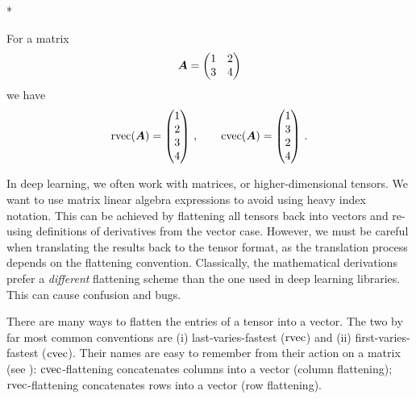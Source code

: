 \switchcolumn[1]*
\begin{example}\label{ex:flattening}
  For a matrix
  \begin{equation*}
    {\bm{A}} = \begin{pmatrix} 1 & 2 \\ 3 & 4 \end{pmatrix}
  \end{equation*}
  we have
  \begin{equation*}
    \operatorname{rvec}({\bm{A}})
    =
    \begin{pmatrix}
      1 \\ 2 \\ 3 \\ 4
    \end{pmatrix}\,,
    \qquad
    \operatorname{cvec}({\bm{A}})
    =
    \begin{pmatrix}
      1 \\ 3 \\ 2 \\ 4
    \end{pmatrix}\,.
  \end{equation*}
\end{example}
\switchcolumn[0]

\vspace{\baselineskip}
\begin{caveat}[Flattening]
  In deep learning, we often work with matrices, or higher-dimensional tensors.
  We want to use matrix linear algebra expressions to avoid using heavy index notation.
  This can be achieved by flattening all tensors back into vectors and re-using definitions of derivatives from the vector case.
  However, we must be careful when translating the results back to the tensor format, as the translation process depends on the flattening convention.
  Classically, the mathematical derivations prefer a \emph{different} flattening scheme than the one used in deep learning libraries.
  This can cause confusion and bugs.
\end{caveat}

\switchcolumn[1]
\switchcolumn[0]

There are many ways to flatten the entries of a tensor into a vector.
The two by far most common conventions are (i) last-varies-fastest ($\operatorname{rvec}$) and (ii) first-varies-fastest ($\operatorname{cvec}$).
Their names are easy to remember from their action on a matrix (see ): $\operatorname{cvec}$-flattening concatenates columns into a vector (column flattening); $\operatorname{rvec}$-flattening concatenates rows into a vector (row flattening).

